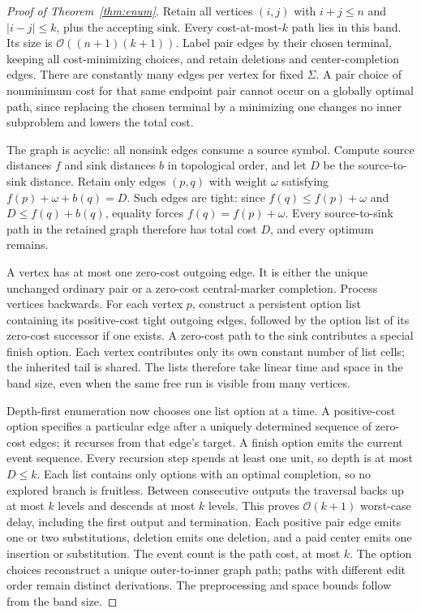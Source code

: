 \documentclass[sigconf,screen]{acmart}
\newcommand{\Oh}{\mathcal O}
\theoremstyle{definition}
\begin{document}
\begin{proof}[Proof of Theorem~\ref{thm:enum}]
Retain all vertices $(i,j)$ with $i+j\le n$ and $|i-j|\le k$, plus the accepting sink. Every cost-at-most-$k$ path lies in this band. Its size is $\Oh((n+1)(k+1))$. Label pair edges by their chosen terminal, keeping all cost-minimizing choices, and retain deletions and center-completion edges. There are constantly many edges per vertex for fixed $\Sigma$. A pair choice of nonminimum cost for that same endpoint pair cannot occur on a globally optimal path, since replacing the chosen terminal by a minimizing one changes no inner subproblem and lowers the total cost.

The graph is acyclic: all nonsink edges consume a source symbol. Compute source distances $f$ and sink distances $b$ in topological order, and let $D$ be the source-to-sink distance. Retain only edges $(p,q)$ with weight $\omega$ satisfying $f(p)+\omega+b(q)=D$. Such edges are tight: since $f(q)\le f(p)+\omega$ and $D\le f(q)+b(q)$, equality forces $f(q)=f(p)+\omega$. Every source-to-sink path in the retained graph therefore has total cost $D$, and every optimum remains.

A vertex has at most one zero-cost outgoing edge. It is either the unique unchanged ordinary pair or a zero-cost central-marker completion. Process vertices backwards. For each vertex $p$, construct a persistent option list containing its positive-cost tight outgoing edges, followed by the option list of its zero-cost successor if one exists. A zero-cost path to the sink contributes a special finish option. Each vertex contributes only its own constant number of list cells; the inherited tail is shared. The lists therefore take linear time and space in the band size, even when the same free run is visible from many vertices.

Depth-first enumeration now chooses one list option at a time. A positive-cost option specifies a particular edge after a uniquely determined sequence of zero-cost edges; it recurses from that edge's target. A finish option emits the current event sequence. Every recursion step spends at least one unit, so depth is at most $D\le k$. Each list contains only options with an optimal completion, so no explored branch is fruitless. Between consecutive outputs the traversal backs up at most $k$ levels and descends at most $k$ levels. This proves $\Oh(k+1)$ worst-case delay, including the first output and termination. Each positive pair edge emits one or two substitutions, deletion emits one deletion, and a paid center emits one insertion or substitution. The event count is the path cost, at most $k$. The option choices reconstruct a unique outer-to-inner graph path; paths with different edit order remain distinct derivations. The preprocessing and space bounds follow from the band size.
\end{proof}
\end{document}

